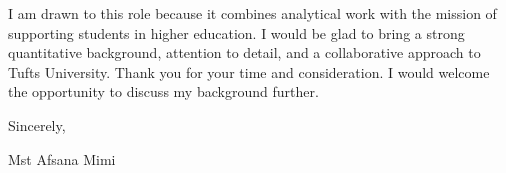 \documentclass[10pt, letterpaper]{article}
\begin{document}
I am drawn to this role because it combines analytical work with the mission of supporting students in higher education. I would be glad to bring a strong quantitative background, attention to detail, and a collaborative approach to Tufts University. Thank you for your time and consideration. I would welcome the opportunity to discuss my background further.

Sincerely,

\vspace{1.5em}

Mst Afsana Mimi
\end{document}

